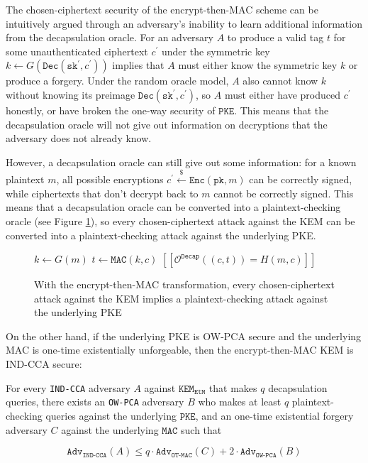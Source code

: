 \documentclass[journal=tches,submission]{iacrtrans}
\newcommand{\pke}{\texttt{PKE}}
\newcommand{\encrypt}{\texttt{Enc}}
\newcommand{\decrypt}{\texttt{Dec}}
\newcommand{\kem}{\texttt{KEM}}
\newcommand{\decap}{\texttt{Decap}}
\newcommand{\etm}{\texttt{EtM}}  %
\newcommand{\mac}{\texttt{MAC}}
\newcommand{\pk}{\texttt{pk}}
\newcommand{\sk}{\texttt{sk}}
\newcommand{\pco}{\texttt{PCO}}
\newcommand{\leftsample}{\stackrel{\$}{\leftarrow}}
\newcommand{\llbrack}{[\![}
\newcommand{\rrbrack}{]\!]}
\newcommand{\adv}{\texttt{Adv}}
\begin{document}
The chosen-ciphertext security of the encrypt-then-MAC scheme can be intuitively argued through an adversary's inability to learn additional information from the decapsulation oracle. For an adversary $A$ to produce a valid tag $t$ for some unauthenticated ciphertext $c^\prime$ under the symmetric key $k \leftarrow G(\decrypt(\sk^\prime, c^\prime))$ implies that $A$ must either know the symmetric key $k$ or produce a forgery. Under the random oracle model, $A$ also cannot know $k$ without knowing its preimage $\decrypt(\sk^\prime, c^\prime)$, so $A$ must either have produced $c^\prime$ honestly, or have broken the one-way security of $\pke$. This means that the decapsulation oracle will not give out information on decryptions that the adversary does not already know. 

However, a decapsulation oracle can still give out some information: for a known plaintext $m$, all possible encryptions $c^\prime \leftsample \encrypt(\pk, m)$ can be correctly signed, while ciphertexts that don't decrypt back to $m$ cannot be correctly signed. This means that a decapsulation oracle can be converted into a plaintext-checking oracle (see Figure \ref{fig:pco-using-decap-oracle}), so every chosen-ciphertext attack against the KEM can be converted into a plaintext-checking attack against the underlying PKE.

\begin{figure}[H]
    \centering
    \begin{minipage}{0.45\textwidth}
    \begin{algorithm}[H]
        \caption*{$\pco(m, c)$}
        \begin{algorithmic}[1]
            \State $k \leftarrow G(m)$
            \State $t \leftarrow \mac(k, c)$
            \State \Return $\llbrack \mathcal{O}^\decap((c, t)) = H(m, c)\rrbrack$
        \end{algorithmic}
    \end{algorithm}
    \end{minipage}
    \caption{With the encrypt-then-MAC transformation, every chosen-ciphertext attack against the KEM implies a plaintext-checking attack against the underlying PKE}\label{fig:pco-using-decap-oracle}
\end{figure}

On the other hand, if the underlying PKE is OW-PCA secure and the underlying MAC is one-time existentially unforgeable, then the encrypt-then-MAC KEM is IND-CCA secure:

\begin{theorem}\label{thm:ow-pca-implies-kem-ind-cca2}
    For every \texttt{IND-CCA} adversary $A$ against $\kem_\etm$ that makes $q$ decapsulation queries, there exists an \texttt{OW-PCA} adversary $B$ who makes at least $q$ plaintext-checking queries against the underlying $\pke$, and an one-time existential forgery adversary $C$ against the underlying $\mac$ such that

    \begin{equation*}
        \texttt{Adv}_\texttt{IND-CCA}(A) \leq q \cdot \adv_\texttt{OT-MAC}(C) + 2 \cdot \texttt{Adv}_\texttt{OW-PCA}(B)
    \end{equation*}
\end{theorem}
\end{document}
